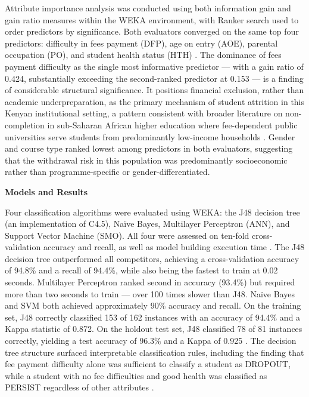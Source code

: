 \documentclass[12pt]{report}
\begin{document}
Attribute importance analysis was conducted using both information gain and gain ratio measures within the WEKA 
environment, with Ranker search used to order predictors by significance. Both evaluators converged on the same top 
four predictors: difficulty in fees payment (DFP), age on entry (AOE), parental occupation (PO), and student health 
status (HTH) \parencite{Ngemu2015}. The dominance of fees payment difficulty as the single most informative
 predictor --- with a gain ratio of 0.424, substantially exceeding the second-ranked predictor at 0.153 --- is a finding 
 of considerable structural significance. It positions financial exclusion, rather than academic underpreparation,
  as the primary mechanism of student attrition in this Kenyan institutional setting, a pattern consistent with 
  broader literature on non-completion in sub-Saharan African higher education where fee-dependent public universities 
  serve students from predominantly low-income households \parencite{Ngemu2015}. Gender and course type ranked lowest
   among predictors in both evaluators, suggesting that the withdrawal risk in this population was predominantly
    socioeconomic rather than programme-specific or gender-differentiated.

\textbf{Models and Results}

Four classification algorithms were evaluated using WEKA: the J48 decision tree (an implementation of C4.5), 
Naïve Bayes, Multilayer Perceptron (ANN), and Support Vector Machine (SMO). All four were assessed on ten-fold
 cross-validation accuracy and recall, as well as model building execution time \parencite{Ngemu2015}. The J48
  decision tree outperformed all competitors, achieving a cross-validation accuracy of 94.8\% and a recall of 94.4\%,
   while also being the fastest to train at 0.02 seconds. Multilayer Perceptron ranked second in accuracy (93.4\%) but 
   required more than two seconds to train --- over 100 times slower than J48. Naïve Bayes and SVM both achieved approximately 
   90\% accuracy and recall. On the training set, J48 correctly classified 153 of 162 instances with an accuracy of 94.4\% and 
   a Kappa statistic of 0.872. On the holdout test set, J48 classified 78 of 81 instances correctly, yielding a test accuracy 
   of 96.3\% and a Kappa of 0.925 \parencite{Ngemu2015}. The decision tree structure surfaced interpretable classification 
   rules, including the finding that fee payment difficulty alone was sufficient to classify a student as DROPOUT, while a
    student with no fee difficulties and good health was classified as PERSIST regardless of other attributes \parencite{Ngemu2015}.
\end{document}
